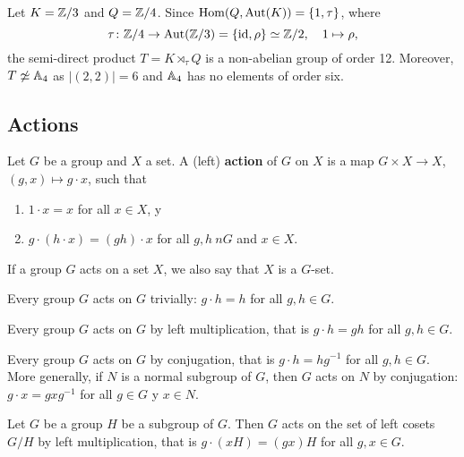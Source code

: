 \begin{example}
Let $K=\mathbb{Z}/3$ and $Q=\mathbb{Z}/4$. Since $\operatorname{Hom}(Q,\operatorname{Aut}(K))=\{1,\tau\}$, where 
\[
\tau\colon\mathbb{Z}/4\to\operatorname{Aut}(\mathbb{Z}/3)=\{\operatorname{id},\rho\}\simeq\mathbb{Z}/2,\quad 1\mapsto\rho,
\]
the semi-direct product $T=K\rtimes_\tau Q$ is a non-abelian group of order 12. Moreover,
$T\not\simeq\mathbb{A}
_4$ as $|(2,2)|=6$ and $\mathbb{A}_4$ has no elements of order six.
\end{example}



\subsection{Actions}

\begin{definition}
    Let $G$ be a group and $X$ a set. 
    A (left) \textbf{action} of $G$ on $X$ is a map 
    $G\times X\to X$, $(g,x)\mapsto g\cdot x$, such that 
    \begin{enumerate}
        \item $1\cdot x=x$ for all $x\in X$, y
        \item $g\cdot (h\cdot x)=(gh)\cdot x$ for all $g,h\ n G$ and $x\in X$.
    \end{enumerate}
\end{definition}

If a group $G$ acts on a set $X$, we also say that
$X$ is a $G$-set.

\begin{example}
Every group $G$ acts on $G$ trivially: $g\cdot h=h$ for all $g,h\in G$.
\end{example}

\begin{example}
Every group $G$ acts on $G$ by left multiplication, that is
$g\cdot h=gh$ for all $g,h\in G$.
\end{example}

\begin{example}
Every group $G$ acts on $G$ by conjugation, that is
$g\cdot h=hg^{-1}$ for all $g,h\in G$. More generally, 
if $N$ is a normal subgroup of $G$, then $G$ acts on
$N$ by conjugation: $g\cdot x=gx
g^{-1}$ for all $g\in G$ y $x\in N$. 
\end{example}

\begin{example}
Let $G$ be a group $H$ be a subgroup of $G$. Then $G$ 
acts on the set of left cosets $G/H$ by left multiplication, that 
is $g\cdot (xH)=(gx)H$ for all $g,x\in G$.
\end{example}

